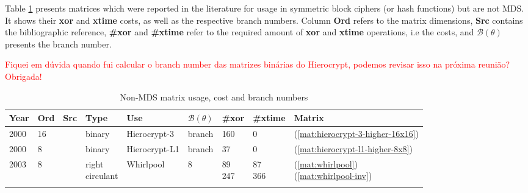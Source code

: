 Table \ref{tbl:non-mds-list} presents matrices which were reported in the literature for usage in symmetric block ciphers (or hash functions) but are not MDS. It shows their \textbf{xor} and \textbf{xtime} costs, as well as the respective branch numbers. Column \textbf{Ord} refers to the matrix dimensions, \textbf{Src} contains the bibliographic reference, \textbf{\#xor} and \textbf{\#xtime} refer to the required amount of \textbf{xor} and \textbf{xtime} operations, i.e the costs, and \textbf{$\mathcal{B}(\theta)$} presents the branch number.

\textcolor{red}{Fiquei em dúvida quando fui calcular o branch number das matrizes binárias do Hierocrypt, podemos revisar isso na próxima reunião? Obrigada!}

\begin{footnotesize}
\begin{longtable}[c]{|l|l|l|l|l|l|l|l|l|}
\hline
\textbf{Year} & \textbf{Ord} & \textbf{Src} & \textbf{Type} & \textbf{Use} & \textbf{$\mathcal{B}(\theta)$} & \textbf{\#xor} & \textbf{\#xtime} & \textbf{Matrix} \\ \hline
\endfirsthead
\endhead

2000 & 16 & \cite{Hierocrypt2000} & binary & Hierocrypt-3 & branch & 160 & 0 & (\ref{mat:hierocrypt-3-higher-16x16}) \\ \hline
2000 & 8 & \cite{Hierocrypt-L1-2000} & binary & Hierocrypt-L1 & branch & 37 & 0 & (\ref{mat:hierocrypt-l1-higher-8x8}) \\ \hline
2003 & 8 & \cite{Whirlpool2003} & \shortstack{right \\ circulant} & Whirlpool & 8 & \shortstack{89\\247} & \shortstack{87\\366} & \shortstack{(\ref{mat:whirlpool})\\(\ref{mat:whirlpool-inv})} \\ \hline

\caption{Non-MDS matrix usage, cost and branch numbers}\label{tbl:non-mds-list}
\end{longtable}
\end{footnotesize}
